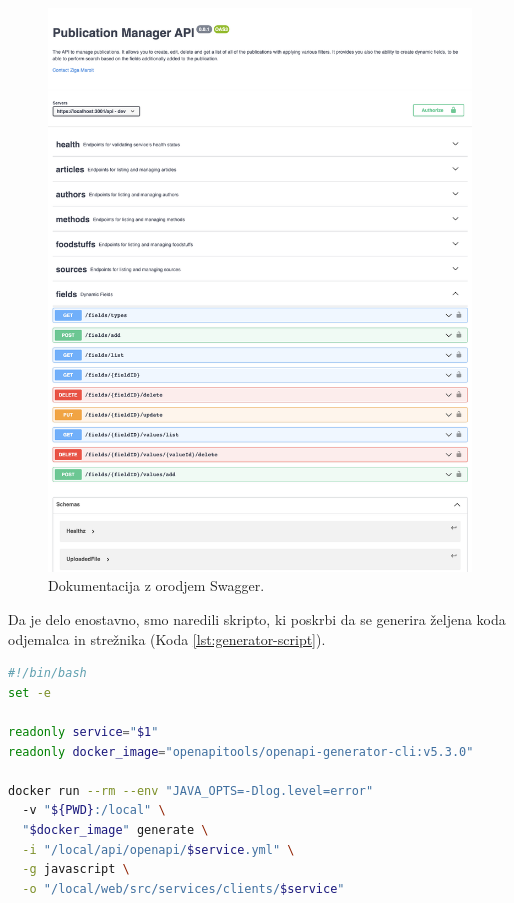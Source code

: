 \documentclass[a4paper, 12pt]{book}
\begin{document}
\newpage
\begin{figure}[h]
\begin{center}
\includegraphics[width=1\textwidth]{slike/documentation.png}
\end{center}
\caption{ Dokumentacija z orodjem Swagger. }
\label{swagger-docs}
\end{figure}
\clearpage


Da je delo enostavno, smo naredili skripto, ki poskrbi da se generira željena koda odjemalca in strežnika (Koda \ref{lst:generator-script}).
\begin{lstlisting}[language=bash, style=mystyle, caption={Skripta, ki poskrbi za generiranje kode za posamezno storitev.},  label=lst:generator-script]
#!/bin/bash
set -e

readonly service="$1"
readonly docker_image="openapitools/openapi-generator-cli:v5.3.0"

docker run --rm --env "JAVA_OPTS=-Dlog.level=error"
  -v "${PWD}:/local" \
  "$docker_image" generate \
  -i "/local/api/openapi/$service.yml" \
  -g javascript \
  -o "/local/web/src/services/clients/$service"
\end{lstlisting}
\end{document}
